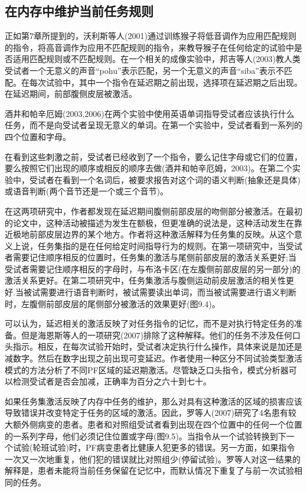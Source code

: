 \subsection{在内存中维护当前任务规则}
\par
正如第7章所提到的，沃利斯等人(2001)通过训练猴子将低音调作为应用匹配规则的指令，将高音调作为应用不匹配规则的指令，来教导猴子在任何给定的试验中是否适用匹配规则或不匹配规则。在一个相关的成像实验中，邦吉等人(2003)教人类受试者一个无意义的声音“pohu”表示匹配，另一个无意义的声音“siba”表示不匹配。在每次试验中，其中一个指令在延迟期之前出现，选择项在延迟期之后出现。在延迟期间，前部腹侧皮层被激活。
\par
酒井和帕辛厄姆(2003,2006)在两个实验中使用英语单词指导受试者应该执行什么任务，而不是向受试者呈现无意义的单词。在第一个实验中，受试者看到一系列的四个位置和字母。
\par
在看到这些刺激之前，受试者已经收到了一个指令，要么记住字母或它们的位置，要么按照它们出现的顺序或相反的顺序去做(酒井和帕辛厄姆，2003)。在第二个实验中，受试者在看到一个名词后，被要求报告对这个词的语义判断(抽象还是具体)或语音判断(两个音节还是一个或三个音节)。
\par
在这两项研究中，作者都发现在延迟期间腹侧前部皮层的吻侧部分被激活。在最初的论文中，这种活动被描述为发生在额极，但更准确的说法是，这种活动发生在靠近极地前部皮层边界的某个地方。作者将这种激活解释为任务集的反映。从这个意义上说，任务集指的是在任何给定时间指导行为的规则。在第一项研究中，当受试者需要记住顺序相反的位置时，任务集的激活与尾侧前部皮层的激活关系更好;当受试者需要记住顺序相反的字母时，与布洛卡区(在左腹侧前部皮层的另一部分)的激活关系更好。在第二项研究中，任务集激活与腹侧运动前皮层激活的相关性更好.当被试需要进行语音判断时，被试需要读出单词，而当被试需要进行语义判断时，左腹侧前部皮层的尾侧部分被激活的效果更好(图9.4)。
\par
可以认为，延迟相关的激活反映了对任务指令的记忆，而不是对执行特定任务的准备。但是海恩斯等人的一项研究(2007)排除了这种解释。他们的任务不涉及任何口头指示。相反，在每次试验开始时，受试者决定执行什么操作，具体来说是加还是减数字。然后在数字出现之前出现可变延迟。作者使用一种区分不同试验类型激活模式的方法分析了不同PF区域的延迟期激活。尽管缺乏口头指令，模式分析器可以检测受试者是否会加减，正确率为百分之六十到七十。
\par
如果任务集激活反映了内存中任务的维护，那么对具有这种激活的区域的损害应该导致错误并改变特定于任务的区域的激活。因此，罗等人(2007)研究了4名患有较大额外侧病变的患者。患者和对照组受试者看到出现在四个位置中的任何一个位置的一系列字母，他们必须记住位置或字母(图9.5)。当指令从一个试验转换到下一个试验(轮班试验)时，PF病变患者比健康人犯更多的错误。另一方面，如果指令一次又一次地重复，他们犯的错误就比对照组少(停留试验)。罗等人对这一结果的解释是，患者未能将当前任务保留在记忆中，而默认情况下重复了与前一次试验相同的任务。
